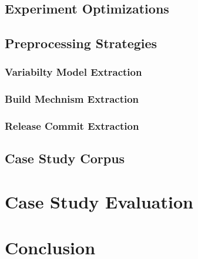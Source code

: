 \documentclass[
	12pt,
	a4paper,
	oneside,
	openright
]{book}
\begin{document}
\section{Experiment Optimizations}

\section{Preprocessing Strategies}
\subsection{Variabilty Model Extraction}
\subsection{Build Mechnism Extraction}
\subsection{Release Commit Extraction}

\section{Case Study Corpus}

\chapter{Case Study Evaluation} \label{chapter:4} 
\chapter{Conclusion}\label{chapter:5}

\clearpage


\end{document}
